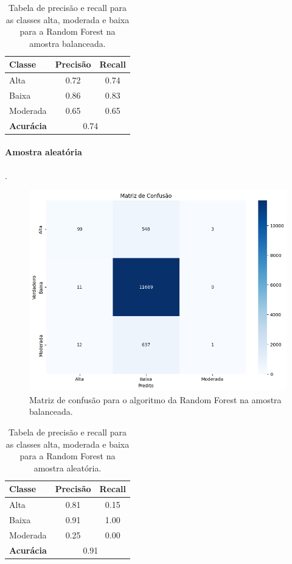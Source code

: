 \begin{table}[H]
    \centering
    \begin{tabular}{lcc}
        \toprule
        \textbf{Classe} & \textbf{Precisão} & \textbf{Recall} \\
        \midrule
        Alta      & 0.72 & 0.74 \\
        Baixa     & 0.86 & 0.83 \\
        Moderada  & 0.65 & 0.65 \\
        \midrule
        \textbf{Acurácia} & \multicolumn{2}{c}{0.74} \\
        \bottomrule
    \end{tabular}
    \caption{Tabela de precisão e recall para as classes alta, moderada e baixa para a Random Forest na amostra balanceada.}
\end{table}

\paragraph{Amostra aleatória}.

\begin{figure}[H]
    \centering
    \includegraphics[scale = 0.4]{Graphics/Mat-Conf-Rand-Ale.png}
    \caption{Matriz de confusão para o algoritmo da Random Forest na amostra balanceada.}
    \label{fig:enter-label}
\end{figure}

\begin{table}[H]
    \centering
    \begin{tabular}{lcc}
        \toprule
        \textbf{Classe} & \textbf{Precisão} & \textbf{Recall} \\
        \midrule
        Alta      & 0.81 & 0.15 \\
        Baixa     & 0.91 & 1.00 \\
        Moderada  & 0.25 & 0.00 \\
        \midrule
        \textbf{Acurácia} & \multicolumn{2}{c}{0.91} \\
        \bottomrule
    \end{tabular}
    \caption{Tabela de precisão e recall para as classes alta, moderada e baixa para a Random Forest na amostra aleatória.}
\end{table}

